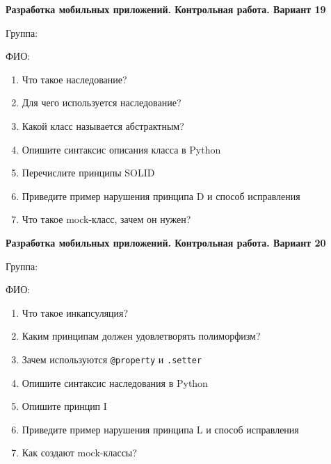 \documentclass[12pt]{article}
\begin{document}
\vspace{40pt}\begin{minipage}{\textwidth}
\textbf{Разработка мобильных приложений. Контрольная работа. Вариант 19}

Группа: \underline{\hspace{3cm}}

ФИО: \underline{\hspace{10cm}}

\begin{enumerate}
\item Что такое наследование?
\item Для чего используется наследование?
\item Какой класс называется абстрактным?
\item Опишите синтаксис описания класса в Python
\item Перечислите принципы SOLID
\item Приведите пример нарушения принципа D и способ исправления
\item Что такое mock-класс, зачем он нужен?

\end{enumerate}
\end{minipage}

\vspace{40pt}\begin{minipage}{\textwidth}
\textbf{Разработка мобильных приложений. Контрольная работа. Вариант 20}

Группа: \underline{\hspace{3cm}}

ФИО: \underline{\hspace{10cm}}

\begin{enumerate}
\item Что такое инкапсуляция?
\item Каким принципам должен удовлетворять полиморфизм?
\item Зачем используются \verb|@property| и \verb|.setter|
\item Опишите синтаксис наследования в Python
\item Опишите принцип I
\item Приведите пример нарушения принципа L и способ исправления
\item Как создают mock-классы?

\end{enumerate}
\end{minipage}
\end{document}
